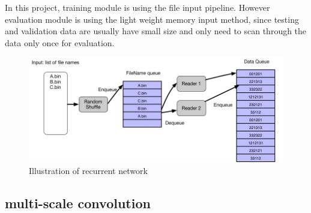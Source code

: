 In this project, training module is using the file input pipeline. However evaluation module is using the light weight memory input method, since testing and validation data are usually have small size and only need to scan through the data only once for evaluation. 

\begin{figure}[H] 
	\centering
	\includegraphics[width=5in]{Figures/input}
	\caption[Detail inside recurrent unit]{Illustration of recurrent network}
	\label{fig:input}
\end{figure}


\subsection{multi-scale convolution}

